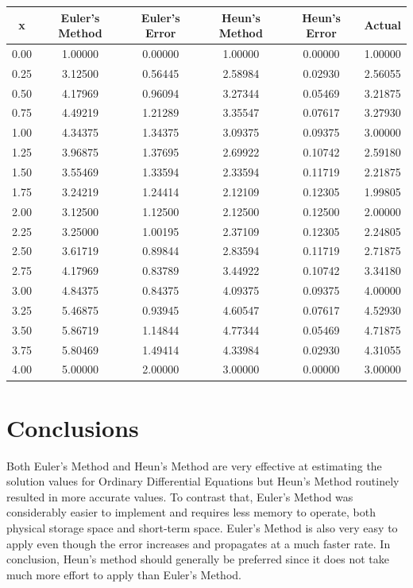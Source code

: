 \documentclass[12pt, letterpaper]{article}
\begin{document}
	\begin{table}[h]
	\centering
	\begin{tabular}{c|cc|cc|c}
	x & Euler's Method & Euler's Error & Heun's Method & Heun's Error & Actual \\ \hline
	0.00 & 1.00000 & 0.00000 & 1.00000 & 0.00000 & 1.00000 \\
	0.25 & 3.12500 & 0.56445 & 2.58984 & 0.02930 & 2.56055 \\
	0.50 & 4.17969 & 0.96094 & 3.27344 & 0.05469 & 3.21875 \\
	0.75 & 4.49219 & 1.21289 & 3.35547 & 0.07617 & 3.27930 \\
	1.00 & 4.34375 & 1.34375 & 3.09375 & 0.09375 & 3.00000 \\
	1.25 & 3.96875 & 1.37695 & 2.69922 & 0.10742 & 2.59180 \\
	1.50 & 3.55469 & 1.33594 & 2.33594 & 0.11719 & 2.21875 \\
	1.75 & 3.24219 & 1.24414 & 2.12109 & 0.12305 & 1.99805 \\
	2.00 & 3.12500 & 1.12500 & 2.12500 & 0.12500 & 2.00000 \\
	2.25 & 3.25000 & 1.00195 & 2.37109 & 0.12305 & 2.24805 \\
	2.50 & 3.61719 & 0.89844 & 2.83594 & 0.11719 & 2.71875 \\
	2.75 & 4.17969 & 0.83789 & 3.44922 & 0.10742 & 3.34180 \\
	3.00 & 4.84375 & 0.84375 & 4.09375 & 0.09375 & 4.00000 \\
	3.25 & 5.46875 & 0.93945 & 4.60547 & 0.07617 & 4.52930 \\
	3.50 & 5.86719 & 1.14844 & 4.77344 & 0.05469 & 4.71875 \\
	3.75 & 5.80469 & 1.49414 & 4.33984 & 0.02930 & 4.31055 \\
	4.00 & 5.00000 & 2.00000 & 3.00000 & 0.00000 & 3.00000
	\end{tabular}
	\end{table}


\section{\label{conclusion}Conclusions}
	Both Euler's Method and Heun's Method are very effective at estimating the solution values for Ordinary Differential Equations but Heun's Method routinely resulted in more accurate values. To contrast that, Euler's Method was considerably easier to implement and requires less memory to operate, both physical storage space and short-term space. Euler's Method is also very easy to apply even though the error increases and propagates at a much faster rate. In conclusion, Heun's method should generally be preferred since it does not take much more effort to apply than Euler's Method. 
\end{document}
